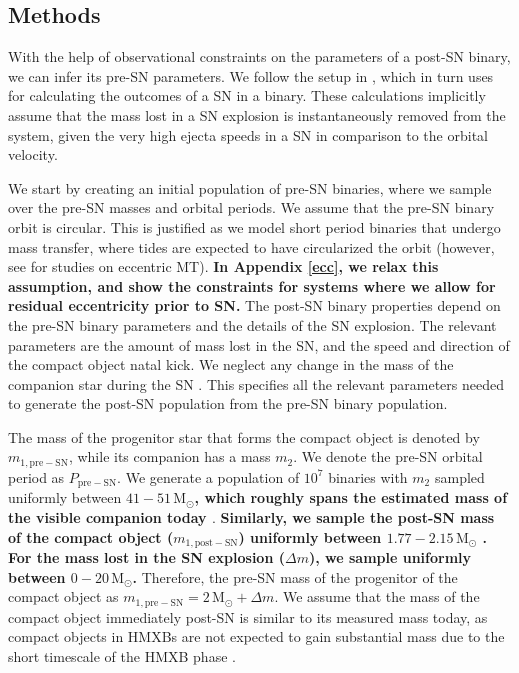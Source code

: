 \documentclass[linenumbers,trackchanges,twocolumn]{aastex701}
\newcommand{\Mdot}{\mathrm{M}_{\odot}}
\begin{document}
\subsection{Methods} \label{sec:monte-carlo-method}

With the help of observational constraints on the parameters of a post-SN binary, we can infer its pre-SN parameters. We follow the setup in \cite{2024OJAp....7E..38E}, which in turn uses \cite{1994astro.ph.12023B} for calculating the outcomes of a SN in a binary. These calculations implicitly assume that the mass lost in a SN explosion is instantaneously removed from the system, given the very high ejecta speeds in a SN in comparison to the orbital velocity.

We start by creating an initial population of pre-SN binaries, where we sample over the pre-SN masses and orbital periods. We assume that the pre-SN binary orbit is circular. This is justified as we model short period binaries that undergo mass transfer, where tides are expected to have circularized the orbit (however, see \citealp{2009MNRAS.400L..20E, 2025ApJ...983...39R,2025arXiv250905243P} for studies on eccentric MT). \textbf{In Appendix \ref{ecc}, we relax this assumption, and show the constraints for systems where we allow for residual eccentricity prior to SN.} The post-SN binary properties depend on the pre-SN binary parameters and the details of the SN explosion. The relevant parameters are the amount of mass lost in the SN, and the speed and direction of the compact object natal kick. We neglect any change in the mass of the companion star during the SN \citep{1998A&A...330.1047T,2018ApJ...864..119H,2021MNRAS.505.2485O}. This specifies all the relevant parameters needed to generate the post-SN population from the pre-SN binary population.

The mass of the progenitor star that forms the compact object is denoted by $m_{1,\mathrm{pre-SN}}$, while its companion has a mass $m_2$. We denote the pre-SN orbital period as $P_{\mathrm{pre-SN}}$. We generate a population of $10^7$ binaries with $m_2$ sampled uniformly between \textbf{$41-51\,\Mdot$, which roughly spans the estimated mass of the visible companion today \citep{2015A&A...577A.130F}}. \textbf{Similarly, we sample the post-SN mass of the compact object ($m_{1,\mathrm{post-SN}}$) uniformly between $1.77-2.15\,\Mdot$ \citep{2015A&A...577A.130F}. For the mass lost in the SN explosion ($\Delta m$), we sample uniformly between $0-20 \, \Mdot$.} Therefore, the pre-SN mass of the progenitor of the compact object as $m_{1,\mathrm{pre-SN}} = 2\, \Mdot + \Delta m$. We assume that the mass of the compact object immediately post-SN is similar to its measured mass today, as compact objects in HMXBs are not expected to gain substantial mass due to the short timescale of the HMXB phase \citep[e.g.,][]{2012ApJ...747..111W, 2023pbse.book.....T}.
\end{document}
